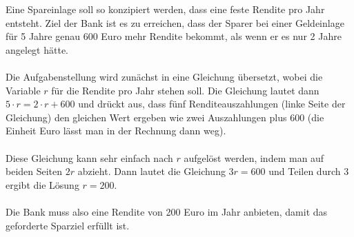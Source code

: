 \begin{MIntro}
\begin{MExample}
  Eine Spareinlage soll so konzipiert werden, dass eine feste Rendite pro Jahr entsteht. Ziel der Bank ist es zu erreichen, dass der Sparer bei einer Geldeinlage für 5 Jahre genau 600 Euro mehr Rendite
  bekommt, als wenn er es nur 2 Jahre angelegt hätte.
  \ \\ \ \\
  Die Aufgabenstellung wird zunächst in eine Gleichung übersetzt, wobei die Variable $r$ für die Rendite pro Jahr stehen soll. Die Gleichung lautet dann $5\cdot r=2\cdot r+600$ und drückt aus,
  dass fünf Renditeauszahlungen (linke Seite der Gleichung) den gleichen Wert ergeben wie zwei Auszahlungen plus 600 (die Einheit Euro lässt man in der Rechnung dann weg).
  \ \\ \ \\
  Diese Gleichung kann sehr einfach nach $r$ aufgelöst werden, indem man auf beiden Seiten $2r$ abzieht. Dann lautet die Gleichung $3r=600$ und Teilen durch $3$ ergibt die Lösung $r=200$.
  \ \\ \ \\
  Die Bank muss also eine Rendite von 200 Euro im Jahr anbieten, damit das geforderte Sparziel erfüllt ist.
\end{MExample}




\end{MIntro}
